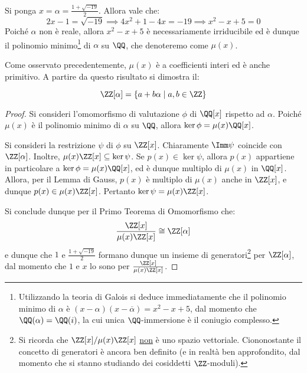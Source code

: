 \documentclass[11pt]{scrartcl}
\begin{document}
	\begin{remark}
		Si ponga $x = \alpha = \frac{1 + \sqrt{-19}}{2}$. Allora vale che:
		\[ 2x - 1 = \sqrt{-19} \implies 4x^2 + 1 - 4x = -19 \implies x^2 - x + 5 = 0 \]
		Poiché $\alpha$ non è reale, allora $x^2 - x + 5$ è necessariamente irriducibile ed è dunque il polinomio minimo\footnote{
			Utilizzando la teoria di Galois si deduce immediatamente che il
			polinomio minimo di $\alpha$ è $(x-\alpha)(x-\overline{\alpha})  = x^2 - x + 5$,
			dal momento che $\QQ(\alpha) = \QQ(i)$, la cui unica $\QQ$-immersione
			è il coniugio complesso.
		} di $\alpha$ su $\QQ$, che denoteremo come
		$\mu(x)$. \medskip
	\end{remark}
	
	Come osservato precedentemente, $\mu(x)$ è a coefficienti interi ed
	è anche primitivo. A partire da questo risultato si dimostra il:

	\begin{lemma}
		\label{lemma:z_alpha_insieme}
		\[
		\ZZ[\alpha] = 
		\{a + b \alpha \mid a, b \in \ZZ\}
		\]
	\end{lemma}
	
	\begin{proof}
		Si consideri l'omomorfismo di valutazione $\phi$ di $\QQ[x]$ rispetto
		ad $\alpha$. Poiché $\mu(x)$ è il polinomio minimo di $\alpha$ su $\QQ$,
		allora $\ker \phi = \mu(x) \QQ[x]$. \medskip
		
		
		Si consideri la restrizione $\psi$ di
		$\phi$ su $\ZZ[x]$. Chiaramente $\Imm \psi$ coincide con $\ZZ[\alpha]$.
		Inoltre, $\mu(x) \ZZ[x] \subseteq \ker \psi$. Se $p(x) \in \ker \psi$,
		allora $p(x)$ appartiene in particolare a $\ker \phi = \mu(x) \QQ[x]$,
		ed è dunque multiplo di $\mu(x)$ in $\QQ[x]$. Allora, per il Lemma
		di Gauss, $p(x)$ è multiplo di $\mu(x)$ anche in $\ZZ[x]$, e
		dunque $p(x) \in \mu(x) \ZZ[x]$. Pertanto $\ker \psi = \mu(x) \ZZ[x]$. \medskip


		Si conclude dunque per il Primo Teorema di Omomorfismo che:
		\[ \frac{\ZZ[x]}{\mu(x)\ZZ[x]} \cong \ZZ[\alpha]  \]
		e dunque che $1$ e $\frac{1 + \sqrt{-19}}{2}$ formano dunque
		un insieme di generatori\footnote{
			Si ricorda che $\ZZ[x]/\mu(x)\ZZ[x]$ \underline{non} è
			uno spazio vettoriale. Ciononostante il concetto di generatori
			è ancora ben definito (e in realtà ben approfondito, dal momento
			che si stanno studiando dei cosiddetti $\ZZ$-moduli).
		} per $\ZZ[\alpha]$, dal momento che
		$1$ e $x$ lo sono per $\frac{\ZZ[x]}{\mu(x)\ZZ[x]}$.
	\end{proof}
	
\end{document}
